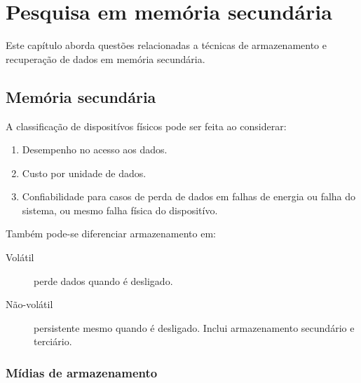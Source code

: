 \chapter{Pesquisa em memória secundária}

Este capítulo aborda questões relacionadas a técnicas de armazenamento
e recuperação de dados em memória secundária.

\section{Memória secundária}

A classificação de dispositívos físicos pode ser feita ao considerar:
\begin{enumerate}
\item Desempenho no acesso aos dados.
\item Custo por unidade de dados.
\item Confiabilidade para casos de perda de dados em falhas de
energia ou falha do sistema, ou mesmo falha física do dispositívo.
\end{enumerate}
Também pode-se diferenciar armazenamento em:
\begin{description}
\item[Volátil] perde dados quando é desligado.
\item[Não-volátil] persistente mesmo quando é desligado. Inclui armazenamento
secundário e terciário.
\end{description}

\subsection{Mídias de armazenamento}

